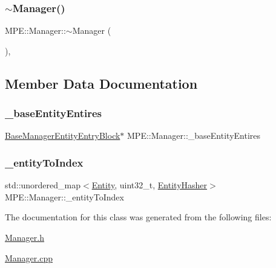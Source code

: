 \mbox{\label{class_m_p_e_1_1_manager_a6bf168edb75ff564f1dee7a9869798f0}} 
\subsubsection{\texorpdfstring{$\sim$\+Manager()}{~Manager()}}
{\footnotesize\ttfamily M\+P\+E\+::\+Manager\+::$\sim$\+Manager (\begin{DoxyParamCaption}{ }\end{DoxyParamCaption})\hspace{0.3cm}{\ttfamily [protected]}, {\ttfamily [virtual]}}



\subsection{Member Data Documentation}
\mbox{\label{class_m_p_e_1_1_manager_a5d8d764913aecc8a92ad83790570df86}} 
\subsubsection{\texorpdfstring{\+\_\+base\+Entity\+Entires}{\_baseEntityEntires}}
{\footnotesize\ttfamily \hyperlink{struct_m_p_e_1_1_base_manager_entity_entry_block}{Base\+Manager\+Entity\+Entry\+Block}$\ast$ M\+P\+E\+::\+Manager\+::\+\_\+base\+Entity\+Entires\hspace{0.3cm}{\ttfamily [private]}}

\mbox{\label{class_m_p_e_1_1_manager_a142d48cdd0daf0b9ad667ea599de586a}} 
\subsubsection{\texorpdfstring{\+\_\+entity\+To\+Index}{\_entityToIndex}}
{\footnotesize\ttfamily std\+::unordered\+\_\+map$<$\hyperlink{struct_m_p_e_1_1_entity}{Entity}, uint32\+\_\+t, \hyperlink{struct_m_p_e_1_1_entity_hasher}{Entity\+Hasher}$>$ M\+P\+E\+::\+Manager\+::\+\_\+entity\+To\+Index\hspace{0.3cm}{\ttfamily [protected]}}



The documentation for this class was generated from the following files\+:\begin{DoxyCompactItemize}
\item 
\hyperlink{_manager_8h}{Manager.\+h}\item 
\hyperlink{_manager_8cpp}{Manager.\+cpp}\end{DoxyCompactItemize}
